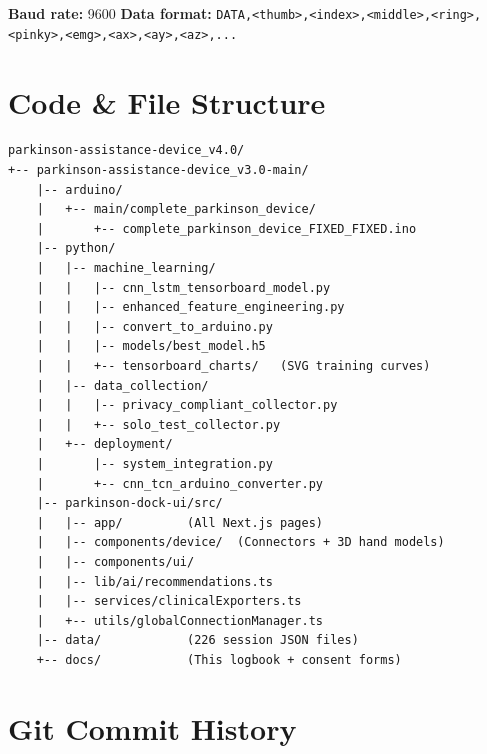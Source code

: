 \documentclass[12pt,a4paper]{article}
\begin{document}
\noindent\textbf{Baud rate:} 9600 \quad
\textbf{Data format:} \texttt{DATA,<thumb>,<index>,<middle>,<ring>,<pinky>,<emg>,<ax>,<ay>,<az>,...}

\section{Code \& File Structure}

\begin{lstlisting}[style=plainstyle]
parkinson-assistance-device_v4.0/
+-- parkinson-assistance-device_v3.0-main/
    |-- arduino/
    |   +-- main/complete_parkinson_device/
    |       +-- complete_parkinson_device_FIXED_FIXED.ino
    |-- python/
    |   |-- machine_learning/
    |   |   |-- cnn_lstm_tensorboard_model.py
    |   |   |-- enhanced_feature_engineering.py
    |   |   |-- convert_to_arduino.py
    |   |   |-- models/best_model.h5
    |   |   +-- tensorboard_charts/   (SVG training curves)
    |   |-- data_collection/
    |   |   |-- privacy_compliant_collector.py
    |   |   +-- solo_test_collector.py
    |   +-- deployment/
    |       |-- system_integration.py
    |       +-- cnn_tcn_arduino_converter.py
    |-- parkinson-dock-ui/src/
    |   |-- app/         (All Next.js pages)
    |   |-- components/device/  (Connectors + 3D hand models)
    |   |-- components/ui/
    |   |-- lib/ai/recommendations.ts
    |   |-- services/clinicalExporters.ts
    |   +-- utils/globalConnectionManager.ts
    |-- data/            (226 session JSON files)
    +-- docs/            (This logbook + consent forms)
\end{lstlisting}

\section{Git Commit History}
\end{document}
